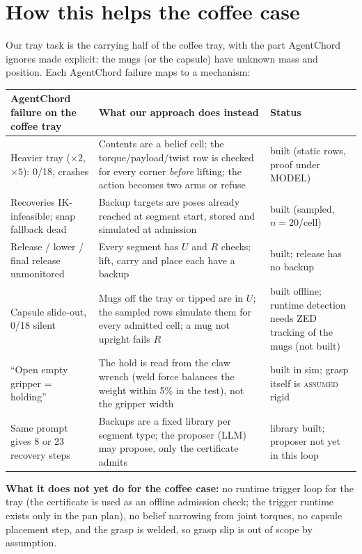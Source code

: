 \documentclass[11pt,a4paper]{article}
\newcommand{\lab}[1]{\textsc{#1}}
\begin{document}
\section{How this helps the coffee case}
Our tray task is the carrying half of the coffee tray, with the part AgentChord ignores made explicit: the mugs (or the capsule)
have unknown mass and position. Each AgentChord failure maps to a mechanism:

\begin{center}\small
\begin{tabularx}{\linewidth}{@{}YY>{\raggedright\arraybackslash}p{3.3cm}@{}}
\toprule
AgentChord failure on the coffee tray & What our approach does instead & Status\\
\midrule
Heavier tray ($\times2$, $\times5$): 0/18, crashes & Contents are a belief cell; the torque/payload/twist row is checked for every
corner \emph{before} lifting; the action becomes two arms or refuse & built (static rows, proof under MODEL)\\
Recoveries IK-infeasible; snap fallback dead & Backup targets are poses already reached at segment start, stored and simulated
at admission & built (sampled, $n=20$/cell)\\
Release / lower / final release unmonitored & Every segment has $U$ and $R$ checks; lift, carry and place each have a backup &
built; release has no backup\\
Capsule slide-out, 0/18 silent & Mugs off the tray or tipped are in $U$; the sampled rows simulate them for every admitted cell;
a mug not upright fails $R$ & built offline; runtime detection needs ZED tracking of the mugs (not built)\\
``Open empty gripper = holding'' & The hold is read from the claw wrench (weld force balances the weight within 5\% in the test),
not the gripper width & built in sim; grasp itself is \lab{assumed} rigid\\
Same prompt gives 8 or 23 recovery steps & Backups are a fixed library per segment type; the proposer (LLM) may propose, only the
certificate admits & library built; proposer not yet in this loop\\
\bottomrule
\end{tabularx}
\end{center}

\noindent\textbf{What it does not yet do for the coffee case:} no runtime trigger loop for the tray (the certificate is used as
an offline admission check; the trigger runtime exists only in the pan plan), no belief narrowing from joint torques, no capsule
placement step, and the grasp is welded, so grasp slip is out of scope by assumption.
\end{document}
